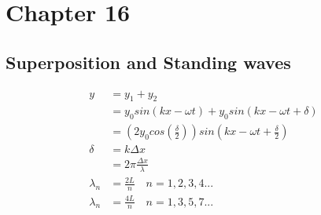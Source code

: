\documentclass{subfile}
\begin{document}
\section{Chapter 16}

\subsection{Superposition and Standing waves}

\begin{align}
	y &= y_{1} + y_{2} \label{16:ssw:1}\\
	&= y_{0}sin\left( kx-\omega t\right) + y_{0} sin\left( kx-\omega t + \delta \right) \label{16:ssw:2}\\
	&= \left( 2y_{0}cos\left(\frac{\delta}{2}\right)\right)sin\left(kx-\omega t + \frac{\delta}{2}\right) \label{16:ssw:3}\\
	\delta &= k\Delta x \label{16:ssw:4}\\
	& = 2\pi \frac{\Delta x}{\lambda} \label{16:ssw:5}\\
	\lambda_{n} &= \frac{2L}{n}\quad n=1,2,3,4... \label{16:ssw:6}\\
	\lambda_{n} &= \frac{4L}{n}\quad n=1,3,5,7... \label{16:ssw:7}
\end{align}
\end{document}
